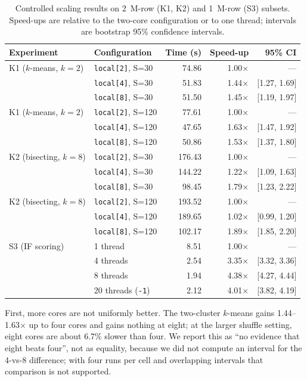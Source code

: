 \documentclass[11pt,a4paper]{article}
\newcommand{\code}[1]{\texttt{\small #1}}
\begin{document}
\begin{table}[t]
\centering
\small
\caption{Controlled scaling results on 2~M-row (K1, K2) and 1~M-row (S3) subsets. Speed-ups are relative to the two-core configuration or to one thread; intervals are bootstrap 95\% confidence intervals.}
\label{tab:scaling}
\begin{tabular}{llrrr}
\toprule
Experiment & Configuration & Time (s) & Speed-up & 95\% CI \\
\midrule
K1 ($k$-means, $k=2$) & \code{local[2]}, S=30 & 74.86 & 1.00$\times$ & --- \\
 & \code{local[4]}, S=30 & 51.83 & 1.44$\times$ & [1.27, 1.69] \\
 & \code{local[8]}, S=30 & 51.50 & 1.45$\times$ & [1.19, 1.97] \\
K1 ($k$-means, $k=2$) & \code{local[2]}, S=120 & 77.61 & 1.00$\times$ & --- \\
 & \code{local[4]}, S=120 & 47.65 & 1.63$\times$ & [1.47, 1.92] \\
 & \code{local[8]}, S=120 & 50.86 & 1.53$\times$ & [1.37, 1.80] \\
K2 (bisecting, $k=8$) & \code{local[2]}, S=30 & 176.43 & 1.00$\times$ & --- \\
 & \code{local[4]}, S=30 & 144.22 & 1.22$\times$ & [1.09, 1.63] \\
 & \code{local[8]}, S=30 & 98.45 & 1.79$\times$ & [1.23, 2.22] \\
K2 (bisecting, $k=8$) & \code{local[2]}, S=120 & 193.52 & 1.00$\times$ & --- \\
 & \code{local[4]}, S=120 & 189.65 & 1.02$\times$ & [0.99, 1.20] \\
 & \code{local[8]}, S=120 & 102.17 & 1.89$\times$ & [1.85, 2.20] \\
S3 (IF scoring) & 1 thread & 8.51 & 1.00$\times$ & --- \\
 & 4 threads & 2.54 & 3.35$\times$ & [3.32, 3.36] \\
 & 8 threads & 1.94 & 4.38$\times$ & [4.27, 4.44] \\
 & 20 threads (\code{-1}) & 2.12 & 4.01$\times$ & [3.82, 4.19] \\
\bottomrule
\end{tabular}
\end{table}

First, more cores are not uniformly better. The two-cluster $k$-means gains 1.44--1.63$\times$ up to four cores and gains nothing at eight; at the larger shuffle setting, eight cores are about 6.7\% slower than four. We report this as ``no evidence that eight beats four'', not as equality, because we did not compute an interval for the 4-vs-8 difference; with four runs per cell and overlapping intervals that comparison is not supported.
\end{document}
